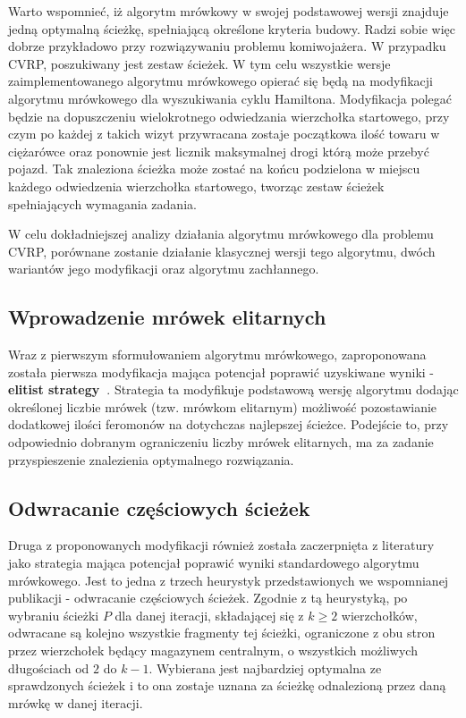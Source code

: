\documentclass[10pt]{article}
\begin{document}
Warto wspomnieć, iż algorytm mrówkowy w swojej podstawowej wersji znajduje jedną optymalną ścieżkę, spełniającą określone kryteria budowy. Radzi sobie więc dobrze przykładowo przy rozwiązywaniu problemu komiwojażera. W przypadku CVRP, poszukiwany jest zestaw ścieżek. W tym celu wszystkie wersje zaimplementowanego algorytmu mrówkowego opierać się będą na modyfikacji algorytmu mrówkowego dla wyszukiwania cyklu Hamiltona. Modyfikacja polegać będzie na dopuszczeniu wielokrotnego odwiedzania wierzchołka startowego, przy czym po każdej z takich wizyt przywracana zostaje początkowa ilość towaru w ciężarówce oraz ponownie  jest licznik maksymalnej drogi którą może przebyć pojazd. Tak znaleziona ścieżka może zostać na końcu podzielona w miejscu każdego odwiedzenia  wierzchołka startowego, tworząc zestaw ścieżek spełniających wymagania zadania.

W celu dokładniejszej analizy działania algorytmu mrówkowego dla problemu CVRP, porównane zostanie działanie klasycznej wersji tego algorytmu, dwóch wariantów jego modyfikacji oraz algorytmu zachłannego.

\subsection{Wprowadzenie mrówek elitarnych}
Wraz z pierwszym sformułowaniem algorytmu mrówkowego, zaproponowana została pierwsza modyfikacja mająca potencjał poprawić uzyskiwane wyniki - \textbf{elitist strategy~\cite{Dorigo1996}}. Strategia ta modyfikuje podstawową wersję algorytmu dodając określonej liczbie mrówek (tzw. mrówkom elitarnym) możliwość pozostawianie dodatkowej ilości feromonów na dotychczas najlepszej ścieżce. Podejście to, przy odpowiednio dobranym ograniczeniu liczby mrówek elitarnych, ma za zadanie przyspieszenie znalezienia optymalnego rozwiązania.

\subsection{Odwracanie częściowych ścieżek}
Druga z proponowanych modyfikacji również została zaczerpnięta z literatury~\cite{Ayop2020} jako strategia mająca potencjał poprawić wyniki standardowego algorytmu mrówkowego. Jest to jedna z trzech heurystyk przedstawionych we wspomnianej publikacji - odwracanie częściowych ścieżek. Zgodnie z tą heurystyką, po wybraniu ścieżki $P$ dla danej iteracji, składającej się z $k \geq 2$ wierzchołków, odwracane są kolejno wszystkie fragmenty tej ścieżki, ograniczone z obu stron przez wierzchołek będący magazynem centralnym, o wszystkich możliwych długościach od $2$ do $k - 1$. Wybierana jest najbardziej optymalna ze sprawdzonych ścieżek i to ona zostaje uznana za ścieżkę odnalezioną przez daną mrówkę w danej iteracji.
\end{document}
